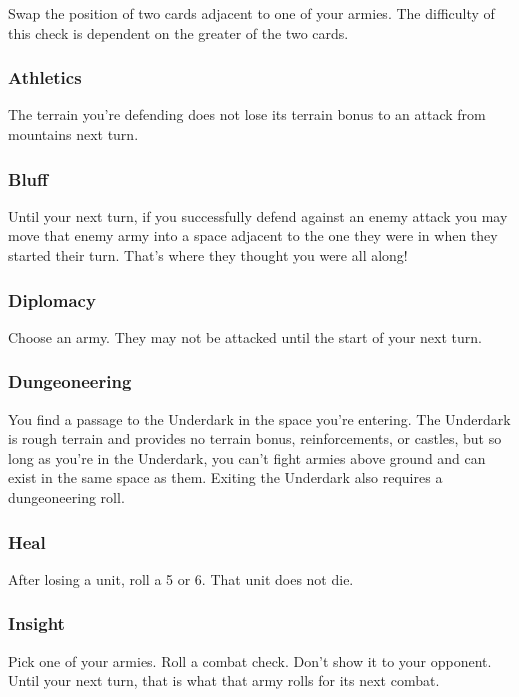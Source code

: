 \documentclass{article}
\begin{document}
Swap the position of two cards adjacent to one of your armies.  The difficulty of this check is dependent on the greater of the two cards.  

\subsubsection{Athletics}

The terrain you're defending does not lose its terrain bonus to an attack from mountains next turn.

\subsubsection{Bluff}

Until your next turn, if you successfully defend against an enemy attack you may move that enemy army into a space adjacent to the one they were in when they started their turn.  That's where they thought you were all along!

\subsubsection{Diplomacy}

Choose an army.  They may not be attacked until the start of your next turn.

\subsubsection{Dungeoneering}

You find a passage to the Underdark in the space you're entering.  The Underdark is rough terrain and provides no terrain bonus, reinforcements, or castles, but so long as you're in the Underdark, you can't fight armies above ground and can exist in the same space as them.  Exiting the Underdark also requires a dungeoneering roll.

\subsubsection{Heal}

After losing a unit, roll a 5 or 6.  That unit does not die.

\subsubsection{Insight}

Pick one of your armies.  Roll a combat check.  Don't show it to your opponent.  Until your next turn, that is what that army rolls for its next combat.
\end{document}
